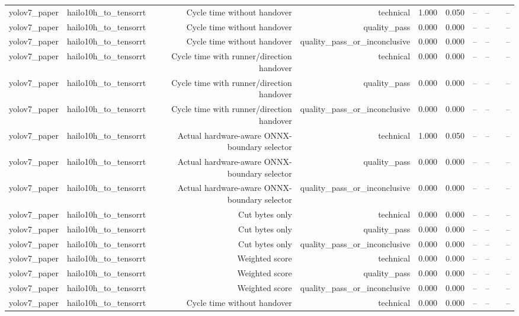 \begin{table}[t]
\begin{tabular}{lrrrrrrrrr}
yolov7\_paper & hailo10h\_to\_tensorrt & Cycle time without handover & technical & 1.000 & 0.050 & -- & -- &  & -- \\
yolov7\_paper & hailo10h\_to\_tensorrt & Cycle time without handover & quality\_pass & 0.000 & 0.000 & -- & -- &  & -- \\
yolov7\_paper & hailo10h\_to\_tensorrt & Cycle time without handover & quality\_pass\_or\_inconclusive & 0.000 & 0.000 & -- & -- &  & -- \\
yolov7\_paper & hailo10h\_to\_tensorrt & Cycle time with runner/direction handover & technical & 0.000 & 0.000 & -- & -- &  & -- \\
yolov7\_paper & hailo10h\_to\_tensorrt & Cycle time with runner/direction handover & quality\_pass & 0.000 & 0.000 & -- & -- &  & -- \\
yolov7\_paper & hailo10h\_to\_tensorrt & Cycle time with runner/direction handover & quality\_pass\_or\_inconclusive & 0.000 & 0.000 & -- & -- &  & -- \\
yolov7\_paper & hailo10h\_to\_tensorrt & Actual hardware-aware ONNX-boundary selector & technical & 1.000 & 0.050 & -- & -- &  & -- \\
yolov7\_paper & hailo10h\_to\_tensorrt & Actual hardware-aware ONNX-boundary selector & quality\_pass & 0.000 & 0.000 & -- & -- &  & -- \\
yolov7\_paper & hailo10h\_to\_tensorrt & Actual hardware-aware ONNX-boundary selector & quality\_pass\_or\_inconclusive & 0.000 & 0.000 & -- & -- &  & -- \\
yolov7\_paper & hailo10h\_to\_tensorrt & Cut bytes only & technical & 0.000 & 0.000 & -- & -- &  & -- \\
yolov7\_paper & hailo10h\_to\_tensorrt & Cut bytes only & quality\_pass & 0.000 & 0.000 & -- & -- &  & -- \\
yolov7\_paper & hailo10h\_to\_tensorrt & Cut bytes only & quality\_pass\_or\_inconclusive & 0.000 & 0.000 & -- & -- &  & -- \\
yolov7\_paper & hailo10h\_to\_tensorrt & Weighted score & technical & 0.000 & 0.000 & -- & -- &  & -- \\
yolov7\_paper & hailo10h\_to\_tensorrt & Weighted score & quality\_pass & 0.000 & 0.000 & -- & -- &  & -- \\
yolov7\_paper & hailo10h\_to\_tensorrt & Weighted score & quality\_pass\_or\_inconclusive & 0.000 & 0.000 & -- & -- &  & -- \\
yolov7\_paper & hailo10h\_to\_tensorrt & Cycle time without handover & technical & 0.000 & 0.000 & -- & -- &  & -- \\

\end{tabular}
\end{table}
